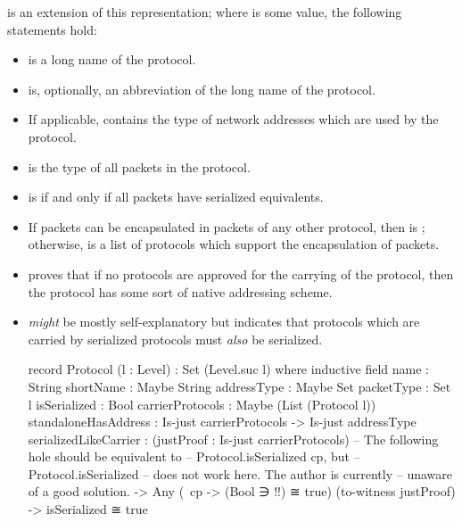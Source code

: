 \documentclass{report}
\begin{document}
 is an extension of this representation; where  is some   value, the following statements hold:
\begin{itemize}
	\item {}  is a long name of the  protocol.
	\item {}  is, optionally, an abbreviation of the long name of the  protocol.
	\item If applicable,   contains the type of network addresses which are used by the  protocol.
	\item {}  is the type of all packets in the  protocol.
	\item {}  is  if and only if all  packets have serialized equivalents.
	\item If  packets can be encapsulated in packets of any other protocol, then   is ; otherwise,   is a list of protocols which support the encapsulation of  packets.
	\item {}  proves that if no protocols are approved for the carrying of the  protocol, then the  protocol has some sort of native addressing scheme.
	\item {} \emph{might} be mostly self-explanatory but indicates that protocols which are carried by serialized protocols must \emph{also} be serialized.

\begin{code}
  record Protocol (l : Level) : Set (Level.suc l) where
    inductive
    field
      name : String
      shortName : Maybe String
      addressType : Maybe Set
      packetType : Set l
      isSerialized : Bool
      carrierProtocols : Maybe (List (Protocol l))
      standaloneHasAddress : Is-just carrierProtocols -> Is-just addressType
      serializedLikeCarrier :  (justProof : Is-just carrierProtocols)
                            -- The following hole should be equivalent to
                            -- Protocol.isSerialized cp, but
                            -- Protocol.isSerialized
                            -- does not work here.  The author is currently
                            -- unaware of a good solution.
                            -> Any (\ cp -> (Bool ∋ {!!}) ≅ true)
                                   (to-witness justProof)
                            -> isSerialized ≅ true
\end{code}


\end{itemize}
\end{document}
